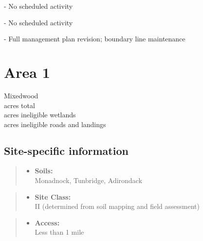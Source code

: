 \documentclass[]{tufte-handout}
\providecommand{\tightlist}{%
  \setlength{\itemsep}{0pt}\setlength{\parskip}{0pt}}
\begin{document}
\vspace{5pt}

 - No scheduled activity

\vspace{5pt}

 - No scheduled activity

\vspace{5pt}

 - Full management plan revision; boundary line
maintenance

\newpage

\section{Area 1}\label{area-1}

Mixedwood\\
 acres total\\
 acres ineligible wetlands\\
 acres ineligible roads and landings

\subsection{Site-specific information}\label{site-specific-information}

\begin{quote}
\begin{itemize}
\tightlist
\item
  \textbf{Soils:}\\
  \indent\indent Monadnock, Tunbridge, Adirondack
\end{itemize}
\end{quote}

\begin{quote}
\begin{itemize}
\tightlist
\item
  \textbf{Site Class:}\\
  \vspace{2pt} II (determined from soil mapping and field assessment)
\end{itemize}
\end{quote}

\begin{quote}
\begin{itemize}
\tightlist
\item
  \textbf{Access:}\\
  \vspace{2pt} Less than 1 mile
\end{itemize}
\end{quote}
\end{document}
